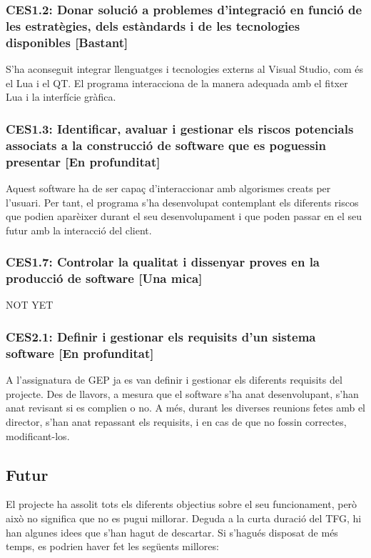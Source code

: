 \documentclass[a4paper]{article}
\begin{document}
\subsubsection*{CES1.2: Donar solució a problemes d'integració en funció de les estratègies, dels estàndards i de les tecnologies disponibles [Bastant]}

S'ha aconseguit integrar llenguatges i tecnologies externs al Visual Studio, com és el Lua i el QT. El programa interacciona de la manera adequada amb el fitxer Lua i la interfície gràfica. 

\subsubsection*{CES1.3: Identificar, avaluar i gestionar els riscos potencials associats a la construcció de software que es poguessin presentar [En profunditat]}

Aquest software ha de ser capaç d'interaccionar amb algorismes creats per l'usuari. Per tant, el programa s'ha desenvolupat contemplant els diferents riscos que podien aparèixer durant el seu desenvolupament i que poden passar en el seu futur amb la interacció del client.

\subsubsection*{CES1.7: Controlar la qualitat i dissenyar proves en la producció de software [Una mica]}

NOT YET

\subsubsection*{CES2.1: Definir i gestionar els requisits d'un sistema software [En profunditat]}

A l'assignatura de GEP ja es van definir i gestionar els diferents requisits del projecte. Des de llavors, a mesura que el software s'ha anat desenvolupant, s'han anat revisant si es complien o no. A més, durant les diverses reunions fetes amb el director, s'han anat repassant els requisits, i en cas de que no fossin correctes, modificant-los.

\subsection{Futur}

El projecte ha assolit tots els diferents objectius sobre el seu funcionament, però això no significa que no es pugui millorar. Deguda a la curta duració del TFG, hi han algunes idees que s'han hagut de descartar. Si s'hagués disposat de més temps, es podrien haver fet les següents millores:
\end{document}

